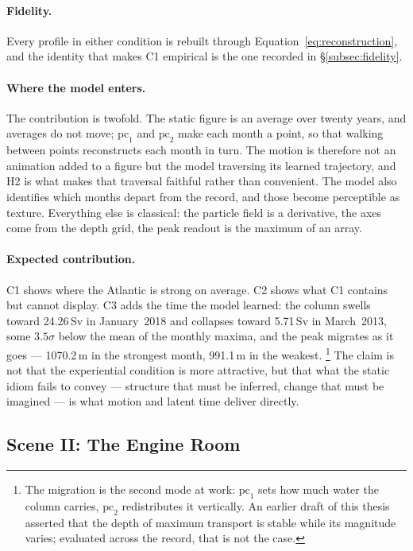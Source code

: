 \paragraph{Fidelity.} Every profile in either condition is rebuilt through Equation~\ref{eq:reconstruction}, and the identity that makes C1 empirical is the one recorded in \S\ref{subsec:fidelity}.

\paragraph{Where the model enters.} The contribution is twofold. The static figure is an average over twenty years, and averages do not move; $\mathrm{pc}_1$ and $\mathrm{pc}_2$ make each month a point, so that walking between points reconstructs each month in turn. The motion is therefore not an animation added to a figure but the model traversing its learned trajectory, and H2 is what makes that traversal faithful rather than convenient. The model also identifies which months depart from the record, and those become perceptible as texture. Everything else is classical: the particle field is a derivative, the axes come from the depth grid, the peak readout is the maximum of an array.

\paragraph{Expected contribution.} C1 shows where the Atlantic is strong on average. C2 shows what C1 contains but cannot display. C3 adds the time the model learned: the column swells toward 24.26\,Sv in January~2018 and collapses toward 5.71\,Sv in March~2013, some $3.5\sigma$ below the mean of the monthly maxima, and the peak migrates as it goes --- 1070.2\,m in the strongest month, 991.1\,m in the weakest.%
\footnote{The migration is the second mode at work: $\mathrm{pc}_1$ sets how much water the column carries, $\mathrm{pc}_2$ redistributes it vertically. An earlier draft of this thesis asserted that the depth of maximum transport is stable while its magnitude varies; evaluated across the record, that is not the case.} The claim is not that the experiential condition is more attractive, but that what the static idiom fails to convey --- structure that must be inferred, change that must be imagined --- is what motion and latent time deliver directly.

\subsection{Scene II: The Engine Room}
\label{subsec:scene-engine}

